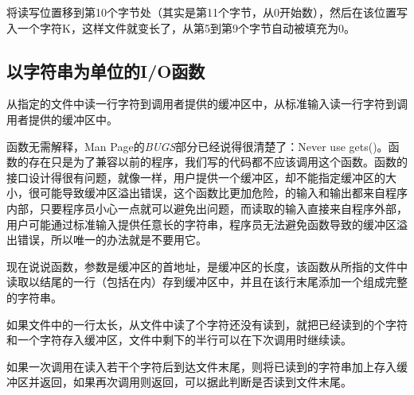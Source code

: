 

将读写位置移到第10个字节处（其实是第11个字节，从0开始数），然后在该位置写入一个字符K，这样文件就变长了，从第5到第9个字节自动被填充为0。


\subsection{以字符串为单位的I/O函数}
%


从指定的文件中读一行字符到调用者提供的缓冲区中，从标准输入读一行字符到调用者提供的缓冲区中。




函数无需解释，Man Page的\emph{BUGS}部分已经说得很清楚了：Never use gets()。函数的存在只是为了兼容以前的程序，我们写的代码都不应该调用这个函数。函数的接口设计得很有问题，就像一样，用户提供一个缓冲区，却不能指定缓冲区的大小，很可能导致缓冲区溢出错误，这个函数比更加危险，的输入和输出都来自程序内部，只要程序员小心一点就可以避免出问题，而读取的输入直接来自程序外部，用户可能通过标准输入提供任意长的字符串，程序员无法避免函数导致的缓冲区溢出错误，所以唯一的办法就是不要用它。



现在说说函数，参数是缓冲区的首地址，是缓冲区的长度，该函数从所指的文件中读取以结尾的一行（包括在内）存到缓冲区中，并且在该行末尾添加一个组成完整的字符串。



如果文件中的一行太长，从文件中读了个字符还没有读到，就把已经读到的个字符和一个字符存入缓冲区，文件中剩下的半行可以在下次调用时继续读。



如果一次调用在读入若干个字符后到达文件末尾，则将已读到的字符串加上存入缓冲区并返回，如果再次调用则返回，可以据此判断是否读到文件末尾。



